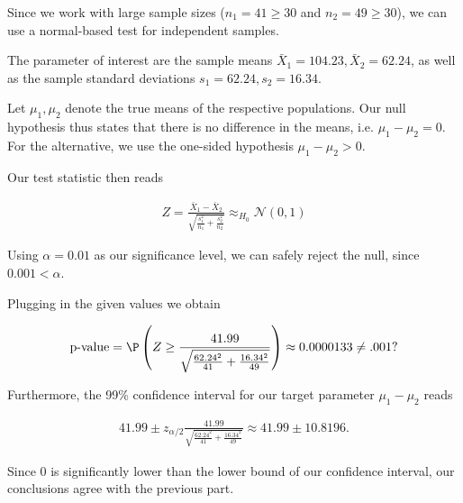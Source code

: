 \begin{solution}

Since we work with large sample sizes ($n_1 = 41 \geq 30$ and $n_2 = 49 \geq 30$),
we can use a normal-based test for independent samples.

The parameter of interest are the sample means $\bar{X}_1 = 104.23, \bar{X}_2 = 62.24$,
as well as the sample standard deviations $s_{1} = 62.24, s_{2} = 16.34$.

Let $\mu_1, \mu_2$ denote the true means of the respective populations.
Our null hypothesis thus states that there is no difference in the means,
i.e. $\mu_1 - \mu_2 = 0$.
For the alternative, we use the one-sided hypothesis $\mu_1 - \mu_2 > 0$.

Our test statistic then reads

\begin{align*}
    Z = \frac{\bar{X}_1 - \bar{X}_2}{\sqrt{\frac{s_1^2}{n_1} + \frac{s_2^2}{n_2}}}
    \approx_{H_0} \mathcal{N}(0,1)
\end{align*}

Using $\alpha = 0.01$ as our significance level, we can safely reject the null, since $0.001 < \alpha$.


Plugging in the given values we obtain 

\begin{align*}
    \text{p-value} = \P\left(Z \geq \frac{41.99}{\sqrt{\frac{62.24^2}{41} + \frac{16.34^2}{49}}}\right)
    \approx 0.0000133 \neq .001 ?
\end{align*}

Furthermore, the 99\% confidence interval for our target parameter $\mu_1 - \mu_2$ reads

\begin{align*}
    41.99 \pm z_{\alpha/2} \frac{41.99}{\sqrt{\frac{62.24^2}{41} + \frac{16.34^2}{49}}}
    \approx 41.99 \pm 10.8196.
\end{align*}

Since $0$ is significantly lower than the lower bound of our confidence interval,
our conclusions agree with the previous part.
\end{solution}

